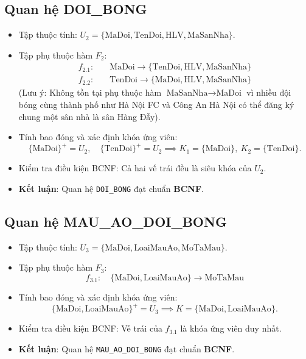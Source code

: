 \subsection{Quan hệ DOI\_BONG}
\begin{itemize}
    \item Tập thuộc tính: $U_2 = \{\text{MaDoi}, \text{TenDoi}, \text{HLV}, \text{MaSanNha}\}$.
    \item Tập phụ thuộc hàm $F_2$:
    \begin{align*}
        f_{2.1}: & \quad \text{MaDoi} \rightarrow \{\text{TenDoi}, \text{HLV}, \text{MaSanNha}\} \\
        f_{2.2}: & \quad \text{TenDoi} \rightarrow \{\text{MaDoi}, \text{HLV}, \text{MaSanNha}\}
    \end{align*}
    (Lưu ý: Không tồn tại phụ thuộc hàm $\text{MaSanNha} \rightarrow \text{MaDoi}$ vì nhiều đội bóng cùng thành phố như Hà Nội FC và Công An Hà Nội có thể đăng ký chung một sân nhà là sân Hàng Đẫy).
    \item Tính bao đóng và xác định khóa ứng viên:
    $$\{\text{MaDoi}\}^+ = U_2, \quad \{\text{TenDoi}\}^+ = U_2 \implies K_1 = \{\text{MaDoi}\}, \ K_2 = \{\text{TenDoi}\}.$$
    \item Kiểm tra điều kiện BCNF: Cả hai vế trái đều là siêu khóa của $U_2$.
    \item \textbf{Kết luận}: Quan hệ \texttt{DOI\_BONG} đạt chuẩn \textbf{BCNF}.
\end{itemize}

\subsection{Quan hệ MAU\_AO\_DOI\_BONG}
\begin{itemize}
    \item Tập thuộc tính: $U_3 = \{\text{MaDoi}, \text{LoaiMauAo}, \text{MoTaMau}\}$.
    \item Tập phụ thuộc hàm $F_3$:
    $$f_{3.1}: \quad \{\text{MaDoi}, \text{LoaiMauAo}\} \rightarrow \text{MoTaMau}$$
    \item Tính bao đóng và xác định khóa ứng viên:
    $$\{\text{MaDoi}, \text{LoaiMauAo}\}^+ = U_3 \implies K = \{\text{MaDoi}, \text{LoaiMauAo}\}.$$
    \item Kiểm tra điều kiện BCNF: Vế trái của $f_{3.1}$ là khóa ứng viên duy nhất.
    \item \textbf{Kết luận}: Quan hệ \texttt{MAU\_AO\_DOI\_BONG} đạt chuẩn \textbf{BCNF}.
\end{itemize}

